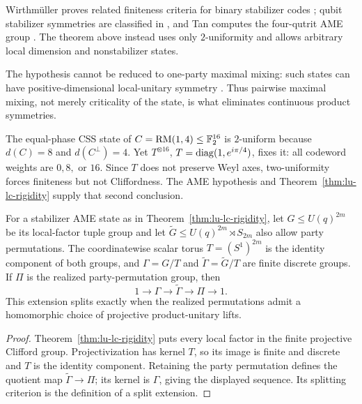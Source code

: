 \begin{remark}
\label{rem:discreteness-prior-art}
Wirthm\"uller proves related finiteness criteria for binary stabilizer codes
\cite[Theorem~7 and Corollary~11]{Wirthmuller2011}; qubit stabilizer
symmetries are classified in \cite{EnglbrechtKraus2020}, and Tan computes
the four-qutrit AME group \cite[Theorem~5.3]{Tan2026}.  The theorem above
instead uses only \(2\)-uniformity and allows arbitrary local dimension and
nonstabilizer states.

The hypothesis cannot be reduced to one-party maximal mixing: such states
can have positive-dimensional local-unitary symmetry
\cite[Lemma~2]{SlowikSawickiMaciazek2021}.  Thus pairwise maximal mixing,
not merely criticality of the state, is what eliminates continuous product
symmetries.
\end{remark}

\begin{remark}
\label{rem:two-uniform-not-clifford}
The equal-phase CSS state of \(C=\mathrm{RM}(1,4)\leq\mathbb F_2^{16}\) is
\(2\)-uniform because \(d(C)=8\) and \(d(C^\perp)=4\).  Yet
\(T^{\otimes16}\), \(T=\operatorname{diag}(1,e^{i\pi/4})\), fixes it: all codeword
weights are \(0,8,\) or \(16\).  Since \(T\) does not preserve Weyl axes,
two-uniformity forces finiteness but not Cliffordness.  The AME hypothesis
and Theorem~\ref{thm:lu-lc-rigidity} supply that second conclusion.
\end{remark}

\begin{corollary}
\label{cor:discrete-lu-symmetry}
For a stabilizer AME state as in Theorem~\ref{thm:lu-lc-rigidity}, let
\(G\leq U(q)^{2m}\) be its local-factor tuple group and let
\(\widetilde G\leq U(q)^{2m}\rtimes S_{2m}\) also allow party
permutations.  The coordinatewise scalar torus \(T=(S^1)^{2m}\) is the
identity component of both groups, and
\(\Gamma=G/T\) and \(\widetilde\Gamma=\widetilde G/T\) are finite discrete
groups.  If \(\Pi\) is the realized party-permutation group, then
\[
  1\longrightarrow \Gamma\longrightarrow\widetilde\Gamma
    \longrightarrow\Pi\longrightarrow 1.
\]
This extension splits exactly when the realized permutations admit a
homomorphic choice of projective product-unitary lifts.
\end{corollary}

\begin{proof}
Theorem~\ref{thm:lu-lc-rigidity} puts every local factor in the finite
projective Clifford group.  Projectivization has kernel \(T\), so its image
is finite and discrete and \(T\) is the identity component.  Retaining the
party permutation defines the quotient map
\(\widetilde\Gamma\to\Pi\); its kernel is \(\Gamma\), giving the displayed
sequence.  Its splitting criterion is the definition of a split extension.
\end{proof}


